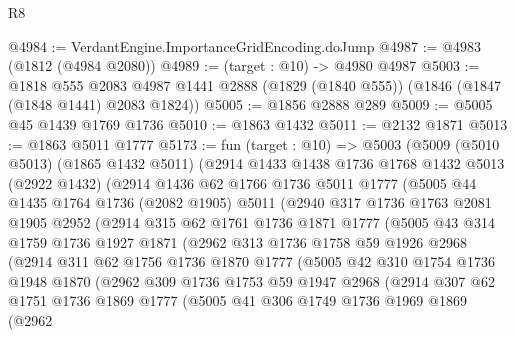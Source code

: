 \begin{lexlean}{R8}
\begin{coremodule}
@4984 := VerdantEngine.ImportanceGridEncoding.doJump
@4987 := @4983 (@1812 (@4984 @2080))
@4989 := (target : @10) -> @4980 @4987
@5003 := @1818
    @555
    @2083
    @4987
    @1441
    @2888
    (@1829 (@1840 @555))
    (@1846 (@1847 (@1848 @1441) @2083 @1824))
@5005 := @1856 @2888 @289
@5009 := @5005 @45 @1439 @1769 @1736
@5010 := @1863 @1432
@5011 := @2132 @1871
@5013 := @1863 @5011 @1777
@5173 := fun (target : @10) =>
  @5003
    (@5009
      (@5010 @5013)
      (@1865 @1432 @5011)
      (@2914
        @1433
        @1438
        @1736
        @1768
        @1432
        @5013
        (@2922 @1432)
        (@2914
          @1436
          @62
          @1766
          @1736
          @5011
          @1777
          (@5005
            @44
            @1435
            @1764
            @1736
            (@2082 @1905)
            @5011
            (@2940
              @317
              @1736
              @1763
              @2081
              @1905
              @2952
              (@2914
                @315
                @62
                @1761
                @1736
                @1871
                @1777
                (@5005
                  @43
                  @314
                  @1759
                  @1736
                  @1927
                  @1871
                  (@2962
                    @313
                    @1736
                    @1758
                    @59
                    @1926
                    @2968
                    (@2914
                      @311
                      @62
                      @1756
                      @1736
                      @1870
                      @1777
                      (@5005
                        @42
                        @310
                        @1754
                        @1736
                        @1948
                        @1870
                        (@2962
                          @309
                          @1736
                          @1753
                          @59
                          @1947
                          @2968
                          (@2914
                            @307
                            @62
                            @1751
                            @1736
                            @1869
                            @1777
                            (@5005
                              @41
                              @306
                              @1749
                              @1736
                              @1969
                              @1869
                              (@2962

\end{coremodule}
\end{lexlean}
